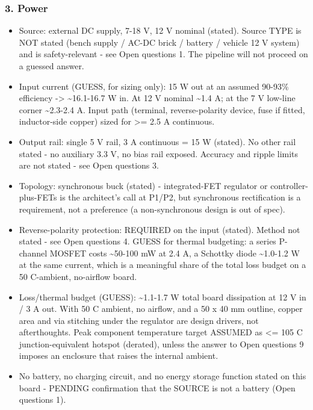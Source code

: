 \documentclass[11pt,a4paper]{article}
\begin{document}
\subsubsection*{3. Power}
\begin{itemize}
\item Source: external DC supply, 7-18 V, 12 V nominal (stated). Source TYPE
is NOT stated (bench supply / AC-DC brick / battery / vehicle 12 V
system) and is safety-relevant - see Open questions 1. The pipeline
will not proceed on a guessed answer.
\item Input current (GUESS, for sizing only): 15 W out at an assumed 90-93\%
efficiency -\textgreater{} \textasciitilde{}16.1-16.7 W in. At 12 V nominal \textasciitilde{}1.4 A; at the 7 V
low-line corner \textasciitilde{}2.3-2.4 A. Input path (terminal, reverse-polarity
device, fuse if fitted, inductor-side copper) sized for \textgreater{}= 2.5 A
continuous.
\item Output rail: single 5 V rail, 3 A continuous = 15 W (stated). No other
rail stated - no auxiliary 3.3 V, no bias rail exposed. Accuracy and
ripple limits are not stated - see Open questions 3.
\item Topology: synchronous buck (stated) - integrated-FET regulator or
controller-plus-FETs is the architect's call at P1/P2, but synchronous
rectification is a requirement, not a preference (a non-synchronous
design is out of spec).
\item Reverse-polarity protection: REQUIRED on the input (stated). Method not
stated - see Open questions 4. GUESS for thermal budgeting: a series
P-channel MOSFET costs \textasciitilde{}50-100 mW at 2.4 A, a Schottky diode \textasciitilde{}1.0-1.2 W
at the same current, which is a meaningful share of the total loss
budget on a 50 C-ambient, no-airflow board.
\item Loss/thermal budget (GUESS): \textasciitilde{}1.1-1.7 W total board dissipation at
12 V in / 3 A out. With 50 C ambient, no airflow, and a 50 x 40 mm
outline, copper area and via stitching under the regulator are design
drivers, not afterthoughts. Peak component temperature target ASSUMED
as \textless{}= 105 C junction-equivalent hotspot (derated), unless the answer to
Open questions 9 imposes an enclosure that raises the internal ambient.
\item No battery, no charging circuit, and no energy storage function stated
on this board - PENDING confirmation that the SOURCE is not a battery
(Open questions 1).
\end{itemize}
\end{document}
